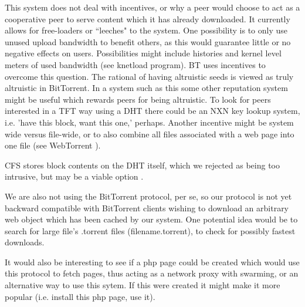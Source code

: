
This system does not deal with incentives, or why a peer would choose to act as a cooperative peer to serve content which it has already downloaded.  It currently allows for free-loaders or ``leeches" to the system.  One possibility is to only use unused upload bandwidth to benefit others, as this would guarantee little or no negative effects on users.  Possibilities might include histories and kernel level meters of used bandwidth (see knetload program).  BT uses incentives to overcome this question.  The rational of having altruistic seeds is viewed as truly altruistic in BitTorrent.  In a system such as this some other reputation system might be useful which rewards peers for being altruistic.  To look for peers interested in a TFT way using a DHT there could be an NXN key lookup system, i.e.  'have this block, want this one,' perhaps.  Another incentive might be system wide versus file-wide, or to also combine all files associated with a web page into one file (see WebTorrent \cite{webtorrent}).

CFS stores block contents on the DHT itself, which we rejected as being too intrusive, but may be a viable option \cite{cfs}.

We are also not using the BitTorrent protocol, per se, so our protocol is not yet backward compatible with BitTorrent clients wishing to download an arbitrary web object which has been cached by our system.  One potential idea would be to search for large file's .torrent files (filename.torrent), to check for possibly fastest downloads.

It would also be interesting to see if a php page could be created which would use this protocol to fetch pages, thus acting as a network proxy with swarming, or an alternative way to use this sytem.  If this were created it might make it more popular (i.e. install this php page, use it).


